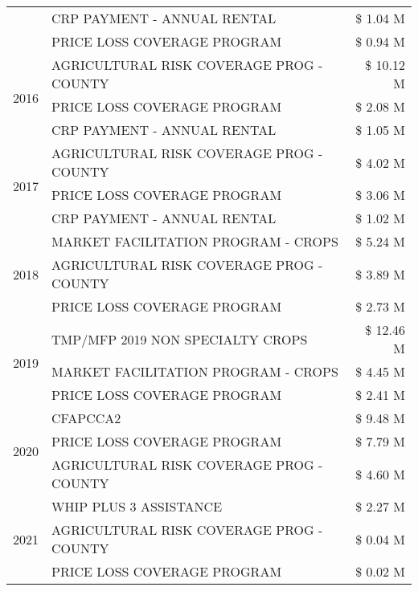 \begin{tabular}{llr}
 & CRP PAYMENT - ANNUAL RENTAL & \$ 1.04 M \\
 & PRICE LOSS COVERAGE PROGRAM & \$ 0.94 M \\
\cline{1-3}
\multirow[t]{3}{*}{2016} & AGRICULTURAL RISK COVERAGE PROG - COUNTY & \$ 10.12 M \\
 & PRICE LOSS COVERAGE PROGRAM & \$ 2.08 M \\
 & CRP PAYMENT - ANNUAL RENTAL & \$ 1.05 M \\
\cline{1-3}
\multirow[t]{3}{*}{2017} & AGRICULTURAL RISK COVERAGE PROG - COUNTY & \$ 4.02 M \\
 & PRICE LOSS COVERAGE PROGRAM & \$ 3.06 M \\
 & CRP PAYMENT - ANNUAL RENTAL & \$ 1.02 M \\
\cline{1-3}
\multirow[t]{3}{*}{2018} & MARKET FACILITATION PROGRAM - CROPS & \$ 5.24 M \\
 & AGRICULTURAL RISK COVERAGE PROG - COUNTY & \$ 3.89 M \\
 & PRICE LOSS COVERAGE PROGRAM & \$ 2.73 M \\
\cline{1-3}
\multirow[t]{3}{*}{2019} & TMP/MFP 2019 NON SPECIALTY CROPS & \$ 12.46 M \\
 & MARKET FACILITATION PROGRAM - CROPS & \$ 4.45 M \\
 & PRICE LOSS COVERAGE PROGRAM & \$ 2.41 M \\
\cline{1-3}
\multirow[t]{3}{*}{2020} & CFAPCCA2 & \$ 9.48 M \\
 & PRICE LOSS COVERAGE PROGRAM & \$ 7.79 M \\
 & AGRICULTURAL RISK COVERAGE PROG - COUNTY & \$ 4.60 M \\
\cline{1-3}
\multirow[t]{3}{*}{2021} & WHIP PLUS 3 ASSISTANCE & \$ 2.27 M \\
 & AGRICULTURAL RISK COVERAGE PROG - COUNTY & \$ 0.04 M \\
 & PRICE LOSS COVERAGE PROGRAM & \$ 0.02 M \\
\cline{1-3}
\bottomrule
\end{tabular}
